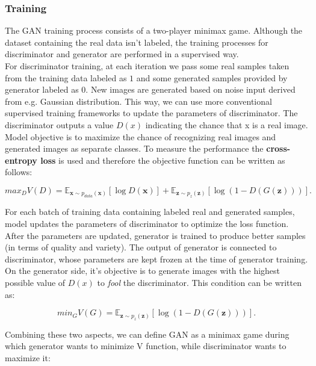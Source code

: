 \documentclass[12pt,a4paper,openany]{book}
\begin{document}
\subsubsection{Training}
\noindent The GAN training process consists of a two-player minimax game.  Although the dataset containing the real data isn’t labeled, the training processes for discriminator and generator are performed in a supervised way.  \\
\noindent For discriminator training, at each iteration we pass some real samples taken from the training data labeled as $1$ and some generated samples provided by generator labeled as $0$. New images are generated based on noise input derived from e.g. Gaussian distribution. This way, we can use more conventional supervised training frameworks to update the parameters of discriminator. The discriminator outputs a value $D(x)$ indicating the chance that x is a real image. Model objective is to maximize the chance of recognizing real images and generated images as separate classes. To measure the performance the \textbf{cross-entropy loss} is used and therefore the objective function can be written as follows:

\begin{equation}
max_{D} V(D) = \mathbb{E}_{\textbf{x} \sim p_{data}(\textbf{x})} [\log D(\textbf{x})] + \mathbb{E}_{\textbf{z} \sim p_{z}(\textbf{z})} [\log(1-D(G(\textbf{z})))].
\end{equation}

\noindent For each batch of training data containing labeled real and generated samples, model updates the parameters of discriminator to optimize the loss function. After the parameters are updated, generator is trained to produce better samples (in terms of quality and variety). The output of generator is connected to discriminator, whose parameters are kept frozen at the time of generator training. On the generator side, it's objective is to generate images with the highest possible value of $D(x)$ to \textit{fool} the discriminator. This condition can be written as:

\begin{equation}
min_{G} V(G) = \mathbb{E}_{\textbf{z} \sim p_{z}(\textbf{z})} [\log(1-D(G(\textbf{z})))].
\end{equation}

\noindent Combining these two aspects, we can define GAN as a minimax game during which generator wants to minimize V function, while discriminator wants to maximize it:
\end{document}
